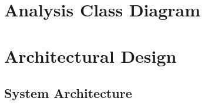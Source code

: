 \documentclass[]{article}
\begin{document}


\section{Analysis Class Diagram}
\label{sec:analysis_class_diagram}


\section{Architectural Design}
\label{sec:architectural_design}

\subsection{System Architecture}
\end{document}
